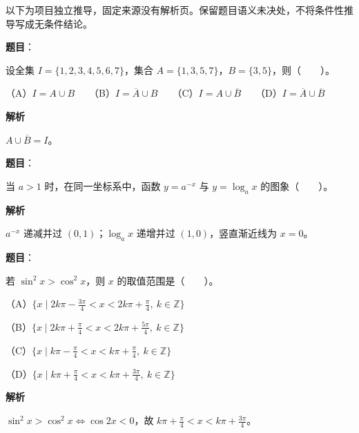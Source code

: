 

\begin{gktip}
以下为项目独立推导，固定来源没有解析页。保留题目语义未决处，不将条件性推导写成无条件结论。
\end{gktip}

\begin{answer}

\textbf{题目}：

设全集 $I=\{1,2,3,4,5,6,7\}$，集合 $A=\{1,3,5,7\}$，$B=\{3,5\}$，则\mbox{（　　）}。

（A）$I=A\cup B$　　（B）$I=\overline{A}\cup B$　　（C）$I=A\cup\overline{B}$　　（D）$I=\overline{A}\cup\overline{B}$

\textbf{解析}

$A\cup\overline B=I$。


\end{answer}
\begin{answer}

\textbf{题目}：

当 $a>1$ 时，在同一坐标系中，函数 $y=a^{-x}$ 与 $y=\log_a x$ 的图象\mbox{（　　）}。
\nopagebreak[4]
\begin{center}\end{center}
\nopagebreak[4]
\textbf{解析}

$a^{-x}$ 递减并过 $(0,1)$；$\log_a x$ 递增并过 $(1,0)$，竖直渐近线为 $x=0$。


\end{answer}
\begin{answer}

\textbf{题目}：

若 $\sin^2 x>\cos^2 x$，则 $x$ 的取值范围是\mbox{（　　）}。

（A）$\{x\mid 2k\pi-\frac{3\pi}{4}<x<2k\pi+\frac{\pi}{4},\ k\in\mathbb{Z}\}$

（B）$\{x\mid 2k\pi+\frac{\pi}{4}<x<2k\pi+\frac{5\pi}{4},\ k\in\mathbb{Z}\}$

（C）$\{x\mid k\pi-\frac{\pi}{4}<x<k\pi+\frac{\pi}{4},\ k\in\mathbb{Z}\}$

（D）$\{x\mid k\pi+\frac{\pi}{4}<x<k\pi+\frac{3\pi}{4},\ k\in\mathbb{Z}\}$

\textbf{解析}

$\sin^2x>\cos^2x\iff\cos2x<0$，故 $k\pi+\frac\pi4<x<k\pi+\frac{3\pi}4$。


\end{answer}
